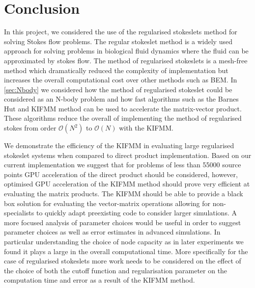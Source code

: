 \FloatBarrier
\section{Conclusion}
In this project, we considered the use of the regularised stokeslets method for solving Stokes flow problems. The regular stokeslet method is a widely used approach for solving problems in biological fluid dynamics where the fluid can be approximated by stokes flow. The method of regularised stokeslets is a mesh-free method which dramatically reduced the complexity of implementation but increases the overall computational cost over other methods such as BEM. In \cref{sec:Nbody} we considered how the method of regularised stokeslet could be considered as an N-body problem and how fast algorithms such as the Barnes Hut and KIFMM method can be used to accelerate the matrix-vector product. These algorithms reduce the overall of implementing the method of regularised stokes from order $\mathcal{O}(N^2)$ to $\mathcal{O}(N)$ with the KIFMM. 

We demonstrate the efficiency of the KIFMM in evaluating large regularised stokeslet systems when compared to direct product implementation. Based on our current implementation we suggest that for problems of less than 55000 source points GPU acceleration of the direct product should be considered, however, optimised GPU acceleration of the KIFMM method should prove very efficient at evaluating the matrix products. The KIFMM should be able to provide a black box solution for evaluating the vector-matrix operations allowing for non-specialists to quickly adapt preexisting code to consider larger simulations. A more focused analysis of parameter choices would be useful in order to suggest parameter choices as well as error estimates in advanced simulations. In particular understanding the choice of node capacity as in later experiments we found it plays a large in the overall computational time. More specifically for the case of regularised stokeslets more work needs to be considered on the effect of the choice of both the cutoff function and regularisation parameter on the computation time and error as a result of the KIFMM method.

